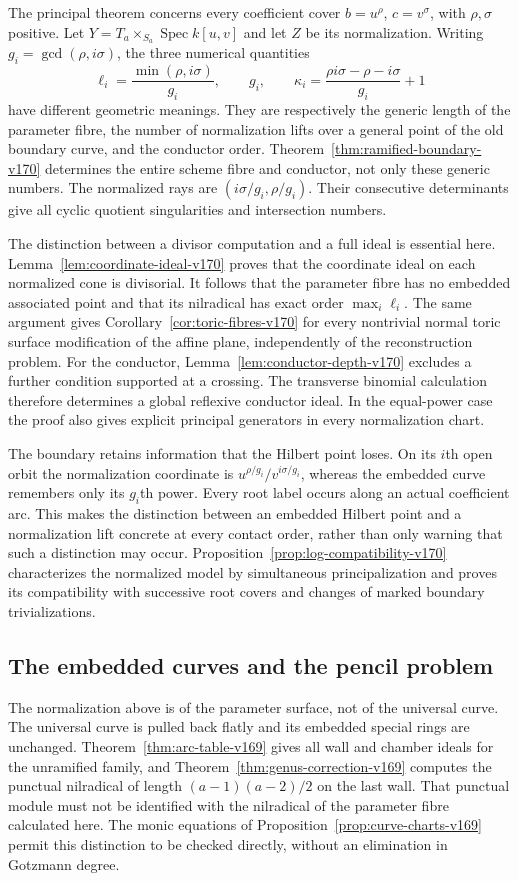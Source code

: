 \documentclass[11pt,reqno]{amsart}
\numberwithin{equation}{section}
\theoremstyle{definition}\newtheorem{definition}[theorem]{Definition}
\theoremstyle{remark}\newtheorem{remark}[theorem]{Remark}
\DeclareMathOperator{\Spec}{Spec}\DeclareMathOperator{\PGL}{PGL}
\begin{document}
The principal theorem concerns every coefficient cover
$b=u^\rho$, $c=v^\sigma$, with $\rho,\sigma$ positive. Let
$Y=T_a\times_{S_a}\Spec k[u,v]$ and let $Z$ be its normalization.
Writing $g_i=\gcd(\rho,i\sigma)$, the three numerical quantities
\[
 \ell_i=\frac{\min(\rho,i\sigma)}{g_i},\qquad
 g_i,\qquad
 \kappa_i=\frac{\rho i\sigma-\rho-i\sigma}{g_i}+1
\]
have different geometric meanings. They are respectively the generic
length of the parameter fibre, the number of normalization lifts over
a general point of the old boundary curve, and the conductor order.
Theorem~\ref{thm:ramified-boundary-v170} determines the entire scheme
fibre and conductor, not only these generic numbers. The normalized
rays are $(i\sigma/g_i,\rho/g_i)$. Their consecutive determinants give
all cyclic quotient singularities and intersection numbers.

The distinction between a divisor computation and a full ideal is
essential here. Lemma~\ref{lem:coordinate-ideal-v170} proves that the
coordinate ideal on each normalized cone is divisorial. It follows
that the parameter fibre has no embedded associated point and that
its nilradical has exact order $\max_i\ell_i$. The same argument
gives Corollary~\ref{cor:toric-fibres-v170} for every nontrivial
normal toric surface modification of the affine plane, independently
of the reconstruction problem. For the conductor,
Lemma~\ref{lem:conductor-depth-v170} excludes a further condition
supported at a crossing. The transverse binomial calculation therefore
determines a global reflexive conductor ideal. In the equal-power
case the proof also gives explicit principal generators in every
normalization chart.

The boundary retains information that the Hilbert point loses. On its
$i$th open orbit the normalization coordinate is
$u^{\rho/g_i}/v^{i\sigma/g_i}$, whereas the embedded curve remembers
only its $g_i$th power. Every root label occurs along an actual
coefficient arc. This makes the distinction between an embedded
Hilbert point and a normalization lift concrete at every contact
order, rather than only warning that such a distinction may occur.
Proposition~\ref{prop:log-compatibility-v170} characterizes the
normalized model by simultaneous principalization and proves its
compatibility with successive root covers and changes of marked
boundary trivializations.

\subsection*{The embedded curves and the pencil problem}
The normalization above is of the parameter surface, not of the
universal curve. The universal curve is pulled back flatly and its
embedded special rings are unchanged. Theorem~\ref{thm:arc-table-v169}
gives all wall and chamber ideals for the unramified family, and
Theorem~\ref{thm:genus-correction-v169} computes the punctual
nilradical of length $(a-1)(a-2)/2$ on the last wall. That punctual
module must not be identified with the nilradical of the parameter
fibre calculated here. The monic equations of
Proposition~\ref{prop:curve-charts-v169} permit this distinction to be
checked directly, without an elimination in Gotzmann degree.
\end{document}
